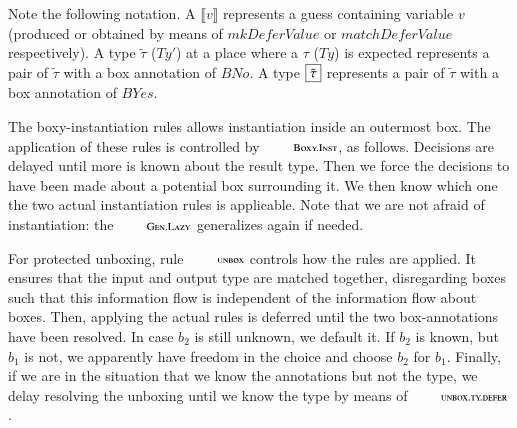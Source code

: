 \documentclass[preprint,natbib]{sigplanconf}
\newcommand{\Conid}[1]{\mathit{#1}}
\newcommand{\Varid}[1]{\mathit{#1}}
\newcommand\sembrack[1]{\llbracket #1 \rrbracket}
\newcommand\tybox[1]{\fbox{$#1$}}
\begin{document}
    Note the following notation. A $\sembrack{v}$ represents a guess containing variable $v$ (produced or obtained by means of \ensuremath{\Varid{mkDeferValue}} or \ensuremath{\Varid{matchDeferValue}} respectively).
    A type $\tilde{\tau}$ (\ensuremath{\Conid{Ty'}}) at a place where a $\tau$ (\ensuremath{\Conid{Ty}}) is expected represents a pair of $\tilde{\tau}$ with a box annotation of \ensuremath{\Conid{BNo}}. A type
    $\tybox{\tilde{\tau}}$ represents a pair of $\tilde{\tau}$ with a box annotation of \ensuremath{\Conid{BYes}}.

    The boxy-instantiation rules allows instantiation inside an outermost box. The application of these rules is
    controlled by $\RefTirName{Boxy.Inst}$, as follows. Decisions are delayed until more is known about the
    result type. Then we force the decisions to have been made about a potential box surrounding it. We then know which
    one the two actual instantiation rules is applicable. Note that we are not afraid of instantiation: the
    $\RefTirName{Gen.Lazy}$ generalizes again if needed.
    
    For protected unboxing, rule $\RefTirName{unbox}$ controls how the rules are applied. It ensures that the input and output type
    are matched together, disregarding boxes such that this information flow is independent of the information flow about boxes. Then,
    applying the actual rules is deferred until the two box-annotations have been resolved. In case $b_2$ is still unknown, we default
    it. If $b_2$ is known, but $b_1$ is not, we apparently have freedom in the choice and choose $b_2$ for $b_1$.
    Finally, if we are in the situation that we know the annotations but not the type, we delay resolving the unboxing until we know the
    type by means of $\RefTirName{unbox.ty.defer}$.
\end{document}
